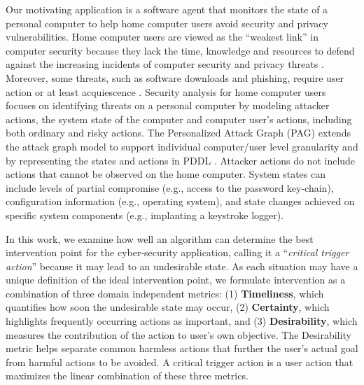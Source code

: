 Our motivating application is a software agent that monitors the state of a personal computer to help home computer users avoid security and privacy vulnerabilities. 
Home computer users are viewed as the ``weakest link'' in computer security because they lack the time, knowledge and resources to defend against the increasing incidents of computer security and privacy threats \cite{sasse2001transforming}. 
Moreover, some threats, such as software downloads and phishing, require user action or at least acquiescence \cite{howe2012psychology}. Security analysis for home computer users focuses on identifying threats on a personal computer by modeling attacker actions, the system state of the computer and computer user's actions, including both ordinary and risky actions. 
The Personalized Attack Graph (PAG) extends the attack graph model \cite{Sheyner2002} to support individual computer/user level granularity and by representing the states and actions in PDDL \cite{urbanska2013}. 
Attacker actions do not include actions that cannot be observed on the home computer. System states can include levels of partial compromise (e.g., access to the password key-chain), configuration information (e.g., operating system), and state changes achieved on specific system components (e.g., implanting a keystroke logger).

In this work, we examine how well an algorithm can determine the best intervention point for the cyber-security application, calling it a ``\textit{critical trigger action}'' because it may lead to an undesirable state. 
As each situation may have a unique definition of the ideal intervention point, we formulate intervention as a combination of three domain independent metrics: (1) \textbf{Timeliness}, which quantifies how soon the undesirable state may occur, (2) \textbf{Certainty}, which highlights frequently occurring actions as important, and (3) \textbf{Desirability}, which measures the contribution of the action to user's own objective. The Desirability metric helps separate common harmless actions that further the user's actual goal from harmful actions to be avoided. A critical trigger action is a user action that maximizes the linear combination of these three metrics.

